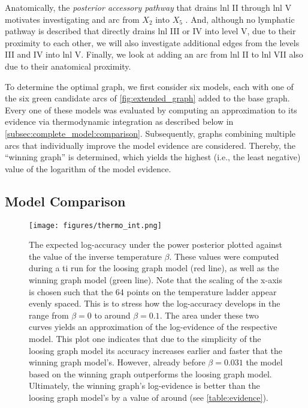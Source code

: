 \documentclass[twocolumn]{aastex631}
\begin{document}
Anatomically, the \emph{posterior accessory pathway} that drains \gls{lnl} II through \gls{lnl} V motivates investigating and arc from $X_2$ into $X_5$ \citep{lengele_anatomical_2007}. And, although no lymphatic pathway is described that directly drains \gls{lnl} III or IV into level V, due to their proximity to each other, we will also investigate additional edges from the levels III and IV into \gls{lnl} V. Finally, we look at adding an arc from \gls{lnl} II to \gls{lnl} VII also due to their anatomical proximity.

To determine the optimal graph, we first consider six models, each with one of the six green candidate arcs of \autoref{fig:extended_graph} added to the base graph. Every one of these models was evaluated by computing an approximation to its evidence via thermodynamic integration as described below in \autoref{subsec:complete_model:comparison}. Subsequently, graphs combining multiple arcs that individually improve the model evidence are considered. Thereby, the ``winning graph'' is determined, which yields the highest (i.e., the least negative) value of the logarithm of the model evidence.

\subsection{Model Comparison}
\label{subsec:complete_model:comparison}

\begin{figure}
    \centering
    \texttt{[image: figures/thermo\_int.png]}
    \caption{The expected log-accuracy under the power posterior plotted against the value of the inverse temperature $\beta$. These values were computed during a \gls{ti} run for the loosing graph model (red line), as well as the winning graph model (green line). Note that the scaling of the x-axis is chosen such that the 64 points on the temperature ladder appear evenly spaced. This is to stress how the log-accuracy develops in the range from $\beta=0$ to around $\beta=0.1$. The area under these two curves yields an approximation of the log-evidence of the respective model. This plot one indicates that due to the simplicity of the loosing graph model its accuracy increases earlier and faster that the winning graph model's. However, already before $\beta=0.031$ the model based on the winning graph outperforms the loosing graph model. Ultimately, the winning graph's log-evidence is better than the loosing graph model's by a value of around  (see \autoref{table:evidence}). \label{fig:thermo_int}}
\end{figure}
\end{document}
